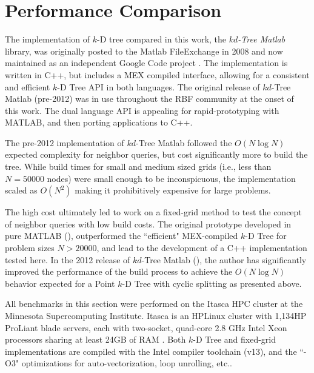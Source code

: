 \documentclass{report}
\begin{document}
\section{Performance Comparison}

The implementation of $k$-D tree compared in this work, the \emph{$kd$-Tree Matlab} library, was originally posted to the Matlab FileExchange in 2008 \cite{TagliasacchiMFE} and now maintained as an independent Google Code project \cite{TagliasacchiGC}. The implementation is written in C++, but includes a MEX compiled interface, allowing for a consistent and efficient $k$-D Tree API in both languages. 
The original release of $kd$-Tree Matlab (pre-2012) was in use throughout the RBF community at the onset of this work. The dual language API is appealing for rapid-prototyping with MATLAB, and then porting applications to C++. 

The pre-2012 implementation of $kd$-Tree Matlab followed the $O(N \log N)$ expected complexity for neighbor queries, but cost significantly more to build the tree. While build times for small and medium sized grids (i.e., less than $N=50000$ nodes) were small enough to be inconspicuous, the implementation scaled as $O(N^2)$ making it prohibitively expensive for large problems. 

The high cost ultimately led to work on a fixed-grid method to test the concept of neighbor queries with low build costs. The original prototype developed in pure MATLAB (\cite{BolligRBFFixedGrid}), outperformed the ``efficient" MEX-compiled $k$-D Tree for problem sizes $N > 20000$, and lead to the development of a C++ implementation tested here. In the 2012 release of $kd$-Tree Matlab (\cite{TagliasacchiGC}), the author has significantly improved the performance of the build process to achieve the $O(N \log N)$ behavior expected for a Point $k$-D Tree with cyclic splitting as presented above. 

All benchmarks in this section were performed on the Itasca HPC cluster at the Minnesota Supercomputing Institute. Itasca is an HPLinux cluster with 1,134HP ProLiant blade servers, each with two-socket, quad-core 2.8 GHz Intel Xeon processors sharing at least 24GB of RAM \cite{MSIItasca}. Both $k$-D Tree and fixed-grid implementations are compiled with the Intel compiler toolchain (v13), and the ``-O3" optimizations for auto-vectorization, loop unrolling, etc.. 
\end{document}
